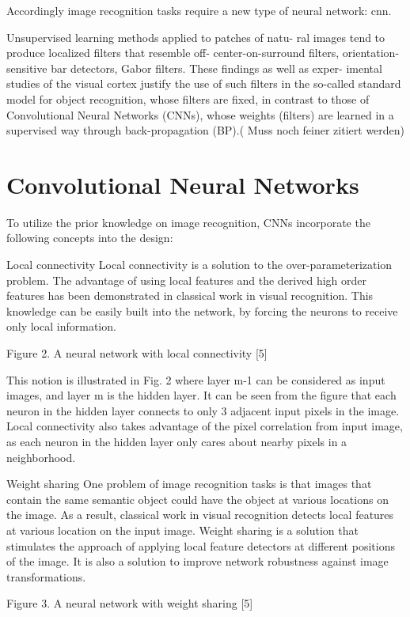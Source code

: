 \documentclass{sig-alternate-05-2015}
\begin{document}
Accordingly image recognition tasks require a new type of neural network: cnn.

Unsupervised learning methods applied to patches of natu- ral images tend to produce localized filters that resemble off- center-on-surround filters, orientation-sensitive bar detectors, Gabor filters. These findings as well as exper- imental studies of the visual cortex justify the use of such filters in the so-called standard model for object recognition, whose filters are fixed, in contrast to those of Convolutional Neural Networks (CNNs), whose weights (filters) are learned in a supervised way through back-propagation (BP).(\cite{6033458} Muss noch feiner zitiert werden)

\section{Convolutional Neural Networks}

To utilize the prior knowledge on image recognition, CNNs incorporate the following concepts into the design:

Local connectivity
Local connectivity is a solution to the over-parameterization problem. The advantage of using local features and the derived high order features has been demonstrated in classical work in visual recognition. This knowledge can be easily built into the network, by forcing the neurons to receive only local information.


Figure 2. A neural network with local connectivity [5]

This notion is illustrated in Fig. 2 where layer m-1 can be considered as input images, and layer m is the hidden layer. It can be seen from the figure that each neuron in the hidden layer connects to only 3 adjacent input pixels in the image. Local connectivity also takes advantage of the pixel correlation from input image, as each neuron in the hidden layer only cares about nearby pixels in a neighborhood.

Weight sharing
One problem of image recognition tasks is that images that contain the same semantic object could have the object at various locations on the image. As a result, classical work in visual recognition detects local features at various location on the input image. Weight sharing is a solution that stimulates the approach of applying local feature detectors at different positions of the image. It is also a solution to improve network robustness against image transformations.


Figure 3. A neural network with weight sharing [5]
\end{document}
